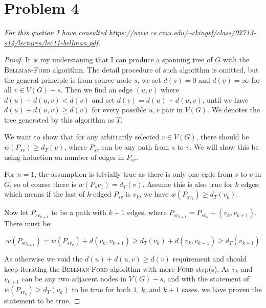 \documentclass[11pt]{article}
\begin{document}
\section*{Problem 4}

\textit{For this quetion I have consulted \url{https://www.cs.cmu.edu/~ckingsf/class/02713-s14/lectures/lec11-bellman.pdf}.}


\begin{proof}

It is my understaning that I can produce a spanning tree of $G$ with the \textsc{Bellman-Ford} algorithm. The detail procedure of such algorithm is omitted, but the general principle is from source node $s$, we set $d(s) = 0$ and $d(v) = \infty$ for all $v \in V(G) - s$. Then we find an edge $(u, v)$ where $d(u) + d(u, v) < d(v)$ and set $d(v) = d(u) + d(u,v)$, until we have $d(u) + d(u, v) \geq d(v)$ for every possible $u, v$ pair in $V(G)$. We denotes the tree generated by this algorithm as $T$.\newline

We want to show that for any arbitrarily selected $v \in V(G)$, there should be $w(P_{sv}) \geq d_T(v)$, where $P_{sv}$ can be any path from $s$ to $v$.  We will show this be using induction on number of edges in $P_{sv}$.

For $n = 1$, the assumption is trivially true as there is only one egde from $s$ to $v$ in $G$, so of course there is $w(P_sv_1) = d_T(v)$. Assume this is also true for $k$ edges: which means if the last of $k$-edged $P_{sv}$ is $v_k$, we have $w(P_{sv_k}) \geq d_T(v_k)$.

Now let $P_{sv_{k+1}}$ to be a path with $k+1$ edges, where $P_{sv_{k+1}} = P_{sv_k} + (v_k, v_{k+1})$. There must be:

\begin{equation*}
    w(P_{sv_{k+1}}) = w(P_{sv_k}) + d(v_k, v_{k+1}) \geq d_T(v_k) + d(v_k, v_{k+1}) \geq d_T(v_{k+1})
\end{equation*}

As otherwise we void the $d(u) + d(u, v) \geq d(v)$ requirement and should keep iterating the \textsc{Bellman-Ford} algorithm with more \textsc{Ford} step(s). As $v_k$ and $v_{k+1}$ can be any two adjacent nodes in $V(G) - s$, and with the statement of $w(P_{sv_k}) \geq d_T(v_k)$ to be true for both $1$, $k$, and $k+1$ cases, we have proven the statement to be true.

\end{proof}

%
% 
% 
\end{document}
